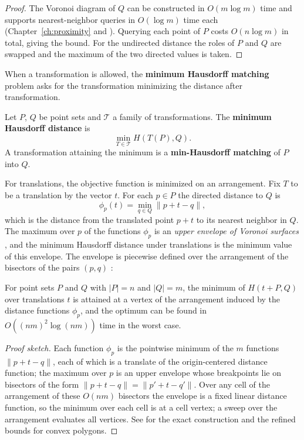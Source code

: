 \begin{proof}
  The Voronoi diagram of $Q$ can be constructed in $O(m \log m)$ time and
  supports nearest-neighbor queries in $O(\log m)$ time each
  (Chapter~\ref{ch:proximity} and \cite{preparata1985,deberg2008}). Querying
  each point of $P$ costs $O(n \log m)$ in total, giving the bound. For the
  undirected distance the roles of $P$ and $Q$ are swapped and the maximum of
  the two directed values is taken.
\end{proof}

When a transformation
is allowed, the \textbf{minimum Hausdorff matching} problem asks for the
transformation minimizing the distance after transformation.

\begin{definition}\label{def:match_min_hausdorff}
  Let $P$, $Q$ be point sets and $\mathcal{T}$ a family of transformations.
  The \textbf{minimum Hausdorff distance} is
  \[
    \min_{T \in \mathcal{T}} H(T(P), Q) .
  \]
  A transformation attaining the minimum is a \textbf{min-Hausdorff
  matching} of $P$ into $Q$.
\end{definition}

For translations, the objective function is minimized on an arrangement. Fix
$T$ to be a translation by the vector $t$. For each $p \in P$ the directed
distance to $Q$ is
\[
  \phi_p(t) = \min_{q \in Q} \|p + t - q\| ,
\]
which is the distance from the translated point $p + t$ to its nearest
neighbor in $Q$. The maximum over $p$ of the functions $\phi_p$ is an
\emph{upper envelope of Voronoi surfaces} \cite{alt1999}, and the minimum
Hausdorff distance under translations is the minimum value of this envelope.
The envelope is piecewise defined over the arrangement of the bisectors of
the pairs $(p, q)$ \cite{alt1999}:

\begin{theorem}\label{thm:match_min_hausdorff_translation}
  For point sets $P$ and $Q$ with $|P| = n$ and $|Q| = m$, the minimum of
  $H(t + P, Q)$ over translations $t$ is attained at a vertex of the
  arrangement induced by the distance functions $\phi_p$, and the optimum can
  be found in $O((nm)^2 \log(nm))$ time in the worst case.
\end{theorem}

\begin{proof}[Proof sketch]
  Each function $\phi_p$ is the pointwise minimum of the $m$ functions
  $\|p + t - q\|$, each of which is a translate of the origin-centered
  distance function; the maximum over $p$ is an upper envelope whose
  breakpoints lie on bisectors of the form $\|p + t - q\| = \|p' + t - q'\|$.
  Over any cell of the arrangement of these $O(nm)$ bisectors the envelope is
  a fixed linear distance function, so the minimum over each cell is at a
  cell vertex; a sweep over the arrangement evaluates all vertices. See
  \cite{alt1999} for the exact construction and the refined bounds for
  convex polygons.
\end{proof}

